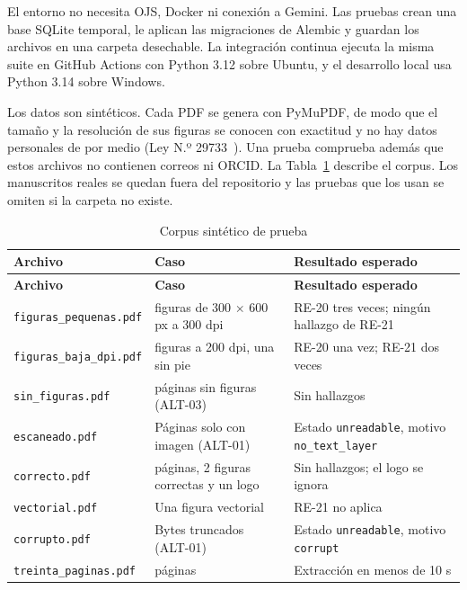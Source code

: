 El entorno no necesita OJS, Docker ni conexión a Gemini. Las pruebas crean una base SQLite temporal, le aplican las migraciones de Alembic y guardan los archivos en una carpeta desechable. La integración continua ejecuta la misma suite en GitHub Actions con Python 3.12 sobre Ubuntu, y el desarrollo local usa Python 3.14 sobre Windows.

Los datos son sintéticos. Cada PDF se genera con PyMuPDF, de modo que el tamaño y la resolución de sus figuras se conocen con exactitud y no hay datos personales de por medio (Ley N.º 29733~\cite{ref36}). Una prueba comprueba además que estos archivos no contienen correos ni ORCID. La Tabla~\ref{tab:3-10} describe el corpus. Los manuscritos reales se quedan fuera del repositorio y las pruebas que los usan se omiten si la carpeta no existe.

{\small
\begin{longtable}{@{}>{\raggedright\arraybackslash}p{}>{\raggedright\arraybackslash}p{}>{\raggedright\arraybackslash}p{}@{}}
\caption{Corpus sintético de prueba}\label{tab:3-10}\\
\toprule
\textbf{Archivo} & \textbf{Caso} & \textbf{Resultado esperado} \\
\midrule
\endfirsthead
\toprule
\textbf{Archivo} & \textbf{Caso} & \textbf{Resultado esperado} \\
\midrule
\endhead
\bottomrule
\endfoot
\endlastfoot
\texttt{figuras\_\allowbreak{}pequenas.\allowbreak{}pdf} & 3 figuras de 300 $\times$ 600 px a 300 dpi & RE-20 tres veces; ningún hallazgo de RE-21 \\
\texttt{figuras\_\allowbreak{}baja\_\allowbreak{}dpi.\allowbreak{}pdf} & 2 figuras a 200 dpi, una sin pie & RE-20 una vez; RE-21 dos veces \\
\texttt{sin\_\allowbreak{}figuras.\allowbreak{}pdf} & 15 páginas sin figuras (ALT-03) & Sin hallazgos \\
\texttt{escaneado.\allowbreak{}pdf} & Páginas solo con imagen (ALT-01) & Estado \texttt{unreadable}, motivo \texttt{no\_\allowbreak{}text\_\allowbreak{}layer} \\
\texttt{correcto.\allowbreak{}pdf} & 10 páginas, 2 figuras correctas y un logo & Sin hallazgos; el logo se ignora \\
\texttt{vectorial.\allowbreak{}pdf} & Una figura vectorial & RE-21 no aplica \\
\texttt{corrupto.\allowbreak{}pdf} & Bytes truncados (ALT-01) & Estado \texttt{unreadable}, motivo \texttt{corrupt} \\
\texttt{treinta\_\allowbreak{}paginas.\allowbreak{}pdf} & 30 páginas & Extracción en menos de 10 s \\
\end{longtable}
}

